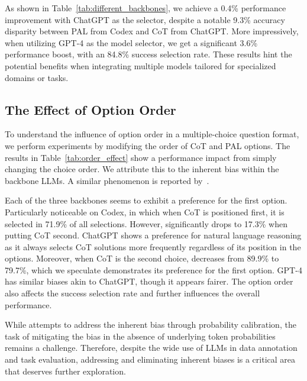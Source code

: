\documentclass[11pt]{article}
\begin{document}
As shown in Table~\ref{tab:different_backbones}, we achieve a 0.4\% performance improvement with ChatGPT as the selector, despite a notable 9.3\% accuracy disparity between PAL from Codex and CoT from ChatGPT. More impressively, when utilizing GPT-4 as the model selector, we get a significant 3.6\% performance boost, with an 84.8\% success selection rate. These results hint the potential benefits when integrating multiple models tailored for specialized domains or tasks.

\subsection{The Effect of Option Order}

To understand the influence of option order in a multiple-choice question format, we perform experiments by modifying the order of CoT and PAL options. The results in Table~\ref{tab:order_effect} show a performance impact from simply changing the choice order. We attribute this to the inherent bias within the backbone LLMs. A similar phenomenon is reported by~\citet{Zheng2023JudgingLW}.

Each of the three backbones seems to exhibit a preference for the first option. Particularly noticeable on Codex, in which when CoT is positioned first, it is selected in 71.9\% of all selections. However,  significantly drops to 17.3\% when putting CoT second. ChatGPT shows a preference for natural language reasoning as it always selects CoT solutions more frequently regardless of its position in the options. Moreover, when CoT is the second choice,  decreases from 89.9\% to 79.7\%, which we speculate demonstrates its preference for the first option. GPT-4 has similar biases akin to ChatGPT, though it appears fairer. The option order also affects the success selection rate and further influences the overall performance. 

While \citet{Zhao2021CalibrateBU} attempts to address the inherent bias through probability calibration, the task of mitigating the bias in the absence of underlying token probabilities remains a challenge. Therefore, despite the wide use of LLMs in data annotation and task evaluation\citep{Xu2023BaizeAO, Wang2023PandaLMAA, vicuna2023}, addressing and eliminating inherent biases is a critical area that deserves further exploration.
\end{document}
